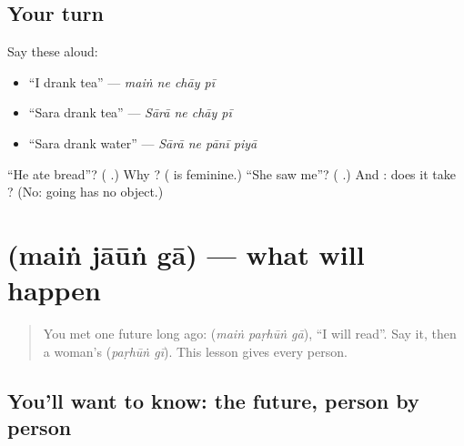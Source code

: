 \subsection*{Your turn}
Say these aloud:

\begin{itemize}
\raggedright
  \item \textquotedblleft{}I drank tea\textquotedblright{} — \emph{maiṅ ne chāy pī}
  \item \textquotedblleft{}Sara drank tea\textquotedblright{} — \emph{Sārā ne chāy pī}
  \item \textquotedblleft{}Sara drank water\textquotedblright{} — \emph{Sārā ne pānī piyā}
\end{itemize}

\begin{tcolorbox}[breakable,colback=teal!4,colframe=teal!35!black,title={Before you move on}]
\textquotedblleft{}He ate bread\textquotedblright{}? (\textbf{   }.) Why \textbf{}? (\textbf{} is feminine.) \textquotedblleft{}She saw me\textquotedblright{}? (\textbf{   }.) And \textbf{ }: does it take \textbf{}? (No: going has no object.)
\end{tcolorbox}
\section[\texorpdfstring{\ur{میں} \ur{جاؤں} \ur{گا} (maiṅ jāūṅ gā)}{میں جاؤں گا (maiṅ jāūṅ gā)}]{   (maiṅ jāūṅ gā) — what will happen}

\label{lesson:UR-C265-main-jaun-ga}



\begin{quote}
You met one future long ago: \textbf{  } (\emph{maiṅ paṛhūṅ gā}), \textquotedblleft{}I will read\textquotedblright{}. Say it, then a woman's \textbf{ } (\emph{paṛhūṅ gī}). This lesson gives every person.
\end{quote}

\subsection*{You'll want to know: the future, person by person}
\begin{quote}
\textbf{  }
\end{quote}

